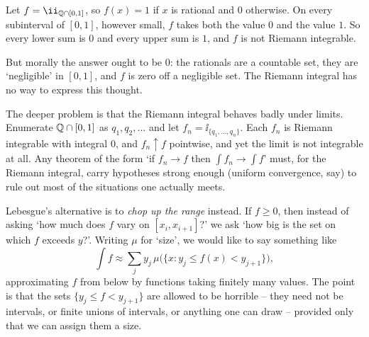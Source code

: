 \documentclass[a4paper]{scrartcl}
\newcommand{\ind}{\ii}
\begin{document}
\begin{example}
	Let $f = \ind_{\Q \cap [0,1]}$, so $f(x) = 1$ if $x$ is rational and $0$ otherwise. On every subinterval of $[0,1]$, however small, $f$ takes both the value $0$ and the value $1$. So every lower sum is $0$ and every upper sum is $1$, and $f$ is not Riemann integrable.

	But morally the answer ought to be $0$: the rationals are a countable set, they are `negligible' in $[0,1]$, and $f$ is zero off a negligible set. The Riemann integral has no way to express this thought.
\end{example}

The deeper problem is that the Riemann integral behaves badly under limits. Enumerate $\mathbb{Q} \cap [0,1]$ as $q_1, q_2, \dots$ and let $f_n = \ind_{\{q_1,\dots,q_n\}}$. Each $f_n$ is Riemann integrable with integral $0$, and $f_n \uparrow f$ pointwise, and yet the limit is not integrable at all. Any theorem of the form `if $f_n \to f$ then $\int f_n \to \int f$' must, for the Riemann integral, carry hypotheses strong enough (uniform convergence, say) to rule out most of the situations one actually meets.

Lebesgue's alternative is to \emph{chop up the range} instead. If $f \geq 0$, then instead of asking `how much does $f$ vary on $[x_i, x_{i+1}]$?' we ask `how big is the set on which $f$ exceeds $y$?'. Writing $\mu$ for `size', we would like to say something like
$$
\int f \approx \sum_j y_j \, \mu\big( \{ x : y_j \leq f(x) < y_{j+1} \} \big),
$$
approximating $f$ from below by functions taking finitely many values. The point is that the sets $\{y_j \leq f < y_{j+1}\}$ are allowed to be horrible -- they need not be intervals, or finite unions of intervals, or anything one can draw -- provided only that we can assign them a size.
\end{document}
